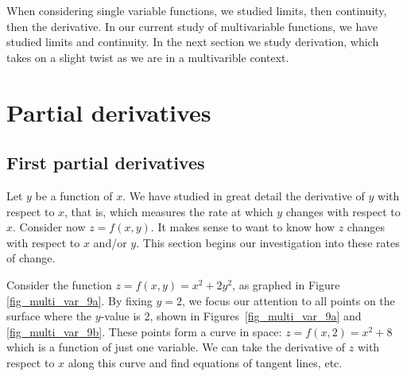 \fi

When considering single variable functions, we studied limits, then continuity, then the derivative. In our current study of multivariable functions, we have studied limits and continuity. In the next section we study derivation, which takes on a slight twist as we are in a multivarible context.

\section{Partial derivatives}\label{sec:partial_derivatives}
\subsection{First partial derivatives}

	\checkoddpage
{}

Let $y$ be a function of $x$. We have studied in great detail the derivative of $y$ with respect to $x$, that is, which measures the rate at which $y$ changes with respect to $x$. Consider now $z=f(x,y)$. It makes sense to want to know how $z$ changes with respect to $x$ and/or $y$. This section begins our investigation into these rates of change.

Consider the function $z=f(x,y) = x^2+2y^2$, as graphed in Figure \ref{fig_multi_var_9a}. By fixing $y=2$, we focus our attention to all points on the surface where the $y$-value is 2, shown in Figures~\ref{fig_multi_var_9a} and \ref{fig_multi_var_9b}. These points form a curve in space: $z = f(x,2) = x^2+8$ which is a function of just one variable. We can take the derivative of $z$ with respect to $x$ along this curve and find equations of tangent lines, etc. 


